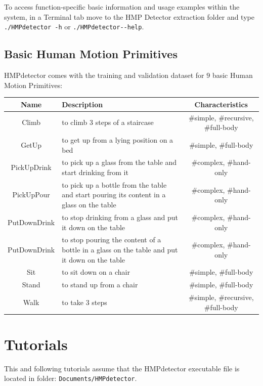 \documentclass[10pt,a4paper]{report}
\begin{document}
To access function-specific basic information and usage examples within the system, in a Terminal tab move to the HMP Detector extraction folder and type \verb+./HMPdetector -h+ or \verb+./HMPdetector--help+.

\section{Basic Human Motion Primitives}

HMPdetector comes with the training and validation dataset for $9$ basic Human Motion Primitives:
\begin{center}
\begin{tabular}{|c|p{6cm}|c|}
\hline
\textbf{Name} & \textbf{Description} & \textbf{Characteristics}\\
\hline
Climb & to climb 3 steps of a staircase & $\#$simple, $\#$recursive, $\#$full-body\\
\hline
GetUp & to get up from a lying position on a bed & $\#$simple, $\#$full-body\\
\hline
PickUpDrink & to pick up a glass from the table and start drinking from it & $\#$complex, $\#$hand-only\\
\hline
PickUpPour & to pick up a bottle from the table and start pouring its content in a glass on the table & $\#$complex, $\#$hand-only\\
\hline
PutDownDrink & to stop drinking from a glass and put it down on the table & $\#$complex, $\#$hand-only\\
\hline
PutDownDrink & to stop pouring the content of a bottle in a glass on the table and put it down on the table & $\#$complex, $\#$hand-only\\
\hline
Sit & to sit down on a chair & $\#$simple, $\#$full-body\\
\hline
Stand & to stand up from a chair & $\#$simple, $\#$full-body\\
\hline
Walk & to take 3 steps & $\#$simple, $\#$recursive, $\#$full-body\\
\hline
\end{tabular}
\end{center}

\chapter{Tutorials}

This and following tutorials assume that the HMPdetector executable file is located in folder: \verb+Documents/HMPdetector+.
\end{document}
